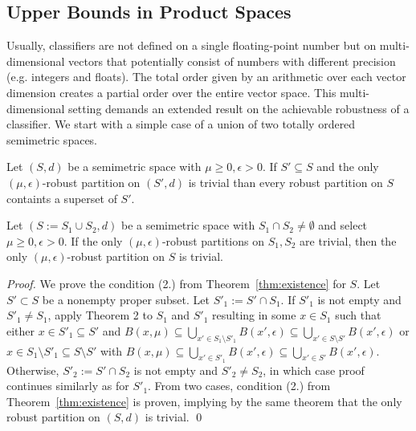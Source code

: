\subsection{Upper Bounds in Product Spaces}
\label{subsec:bounds-product}

Usually, classifiers are not defined on a single floating-point number but on multi-dimensional vectors that potentially consist of numbers with different precision (e.g. integers and floats). The total order given by an arithmetic over each vector dimension creates a partial order over the entire vector space. This multi-dimensional setting demands an extended result on the achievable robustness of a classifier. We start with a simple case of a union of two totally ordered semimetric spaces.

\begin{lemma}[Subclassifier]
    Let $(S, d)$ be a semimetric space with $\mu \geq 0, \epsilon > 0$. If $S' \subseteq S$ and the only $(\mu, \epsilon)$-robust partition on $(S', d)$ is trivial than every robust partition on $S$ containts a superset of $S'$.
\end{lemma}

\begin{lemma}
    \label{lem:intersecting-constant}
    Let $(S := S_1 \cup S_2, d)$ be a semimetric space with $S_1 \cap S_2 \neq \emptyset$ and select $\mu \geq 0, \epsilon > 0$. If the only $(\mu, \epsilon)$-robust partitions on $S_1, S_2$ are trivial, then the only $(\mu, \epsilon)$-robust partition on $S$ is trivial.
\end{lemma}
\begin{proof}
    We prove the condition (2.) from Theorem~\ref{thm:existence} for $S$. Let $S' \subset S$ be a nonempty proper subset. Let $S'_1 := S' \cap S_1$. If $S'_1$ is not empty and $S'_1 \neq S_1$, apply Theorem 2 to $S_1$ and $S'_1$ resulting in some $x \in S_1$ such that either $x \in S'_1 \subseteq S'$ and $B(x, \mu) \subseteq \bigcup_{x' \in S_1 \setminus S'_1} B(x', \epsilon) \subseteq \bigcup_{x' \in S \setminus S'} B(x', \epsilon)$ or $x \in S_1 \setminus S'_1 \subseteq  S \setminus S'$ with $B(x, \mu) \subseteq \bigcup_{x' \in S'_1} B(x', \epsilon) \subseteq \bigcup_{x' \in S'} B(x', \epsilon)$. Otherwise, $S'_2 := S' \cap S_2$ is not empty and $S'_2 \neq S_2$, in which case proof continues similarly as for $S'_1$. From two cases, condition (2.) from Theorem~\ref{thm:existence} is proven, implying by the same theorem that the only robust partition on $(S, d)$ is trivial.
    \qed
\end{proof}

